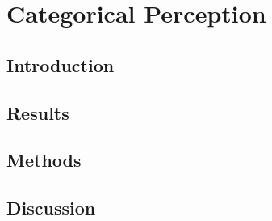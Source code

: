 \chapter{Categorical Perception}
\section{Introduction}


\section{Results}


\section{Methods}


\section{Discussion}
